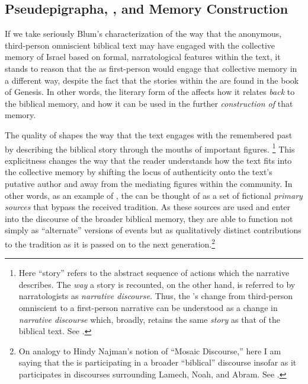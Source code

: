 \subsection{Pseudepigrapha, \ga, and Memory Construction}

If we take seriously Blum's characterization of the way that the anonymous, third-person omniscient biblical text may have engaged with the collective memory of Israel based on formal, narratological features within the text, it stands to reason that the \ga as first-person \psy would engage that collective memory in a different way, despite the fact that the stories within the \ga are found in the book of Genesis. In other words, the literary form of the \ga affects how it relates \emph{back} to the biblical memory, and how it can be used in the further \emph{construction of} that memory.

The \psgraphic quality of \ga shapes the way that the text engages with the remembered past by describing the biblical story through the mouths of important figures.%
%
\footnote{Here ``story'' refers to the abstract sequence of actions which the narrative describes. The \emph{way} a story is recounted, on the other hand, is referred to by narratologists as \emph{narrative discourse.} Thus, the \ga's change from third-person omniscient to a \psgraphical first-person narrative can be understood as a change in \emph{narrative discourse} which, broadly, retains the same \emph{story} as that of the biblical text. See \cite[13--27, esp. 18--19]{abbott2008}.}
%
This explicitness changes the way that the reader understands how the text fits into the collective memory by shifting the locus of authenticity onto the text's putative author and away from the mediating figures within the community. In other words, as an example of \psy, the \ga can be thought of as a set of fictional \emph{primary sources} that bypass the received tradition. As these sources are used and enter into the discourse of the broader biblical memory, they are able to function not simply as ``alternate'' versions of events but as qualitatively distinct contributions to the tradition as it is passed on to the next generation.\footnote{On analogy to Hindy Najman's notion of ``Mosaic Discourse,'' here I am saying that the \ga is participating in a broader ``biblical'' discourse insofar as it participates in discourses surrounding Lamech, Noah, and Abram. See \cite[1--40]{najman2003}.}

